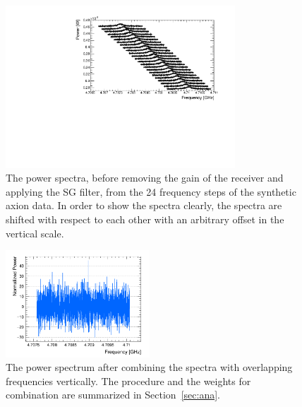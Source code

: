 \begin{figure}[htbp]                                                                                                  
    \centering                                                                                                                       
    \includegraphics[width=8.6cm]{figures/RawSpectra_Faxion_YAxis_Shifted.pdf}
 \caption{The power spectra, before removing the gain of the receiver and applying the 
 SG filter, from the 24 frequency steps of the synthetic axion 
data. In order to show the spectra clearly, the spectra are shifted 
with respect to each other with an arbitrary offset in the vertical scale.}                
\label{fig:faxionstep}                                                                                                            
\end{figure}                       

\begin{figure}[htbp]                                                                                                  
    \centering                                                                                                                       
    \includegraphics[width=0.48\textwidth]{figures/Power_CombSpectrum_FaxionRun_AllSteps_Rescan_SG4_W201_LqWeight.png}
    \caption{The power spectrum after combining the spectra with overlapping 
frequencies vertically. The procedure and the weights for combination 
are summarized in Section~\ref{sec:ana}.}                
\label{fig:faxioncombine}                                                                                                            
\end{figure}                       



